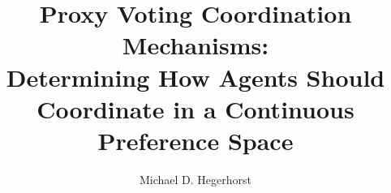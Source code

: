 \author{Michael D. Hegerhorst}
\title{
    Proxy Voting Coordination Mechanisms:\\
    Determining How Agents Should Coordinate in a Continuous Preference Space
}



